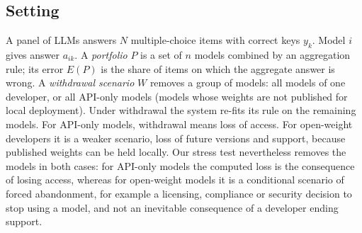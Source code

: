 \documentclass[preprint,12pt,authoryear]{elsarticle}
\begin{document}
\subsection{Setting}
A panel of LLMs answers $N$ multiple-choice items with correct keys $y_k$. Model $i$ gives answer $a_{ik}$. A \emph{portfolio} $P$ is a set of $n$ models combined by an aggregation rule; its error $E(P)$ is the share of items on which the aggregate answer is wrong. A \emph{withdrawal scenario} $W$ removes a group of models: all models of one developer, or all API-only models (models whose weights are not published for local deployment). Under withdrawal the system re-fits its rule on the remaining models. For API-only models, withdrawal means loss of access. For open-weight developers it is a weaker scenario, loss of future versions and support, because published weights can be held locally. Our stress test nevertheless removes the models in both cases: for API-only models the computed loss is the consequence of losing access, whereas for open-weight models it is a conditional scenario of forced abandonment, for example a licensing, compliance or security decision to stop using a model, and not an inevitable consequence of a developer ending support.
\end{document}
